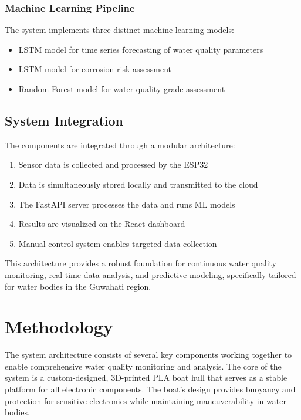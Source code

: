\documentclass[conference]{IEEEtran}
\begin{document}
\subsubsection{Machine Learning Pipeline}
The system implements three distinct machine learning models:
\begin{itemize}
\item LSTM model for time series forecasting of water quality parameters
\item LSTM model for corrosion risk assessment
\item Random Forest model for water quality grade assessment
\end{itemize}

\subsection{System Integration}
The components are integrated through a modular architecture:
\begin{enumerate}
\item Sensor data is collected and processed by the ESP32
\item Data is simultaneously stored locally and transmitted to the cloud
\item The FastAPI server processes the data and runs ML models
\item Results are visualized on the React dashboard
\item Manual control system enables targeted data collection
\end{enumerate}

This architecture provides a robust foundation for continuous water quality monitoring, real-time data analysis, and predictive modeling, specifically tailored for water bodies in the Guwahati region.

\section{Methodology}
The system architecture consists of several key components working together to enable comprehensive water quality monitoring and analysis. The core of the system is a custom-designed, 3D-printed PLA boat hull that serves as a stable platform for all electronic components. The boat's design provides buoyancy and protection for sensitive electronics while maintaining maneuverability in water bodies.
\end{document}
